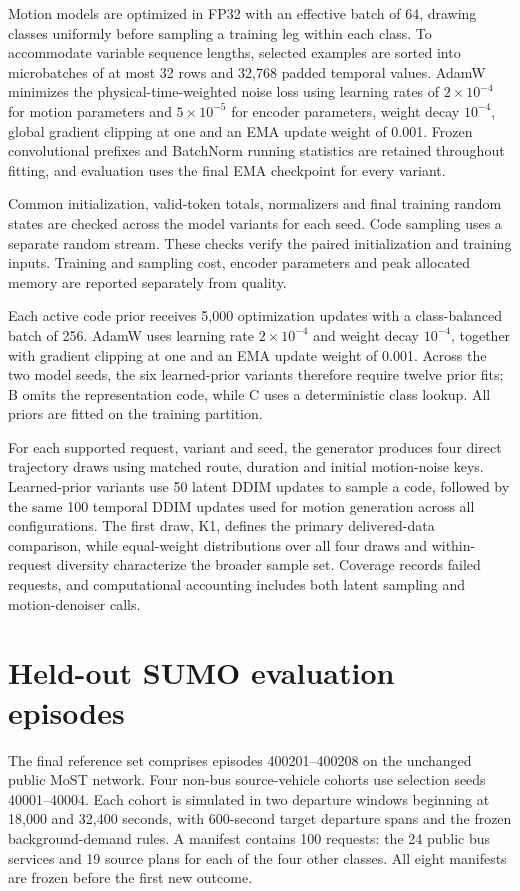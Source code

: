 Motion models are optimized in FP32 with an effective batch of 64, drawing classes uniformly before sampling a training leg within each class. To accommodate variable sequence lengths, selected examples are sorted into microbatches of at most 32 rows and 32,768 padded temporal values. AdamW minimizes the physical-time-weighted noise loss using learning rates of $2\times10^{-4}$ for motion parameters and $5\times10^{-5}$ for encoder parameters, weight decay $10^{-4}$, global gradient clipping at one and an EMA update weight of 0.001. Frozen convolutional prefixes and BatchNorm running statistics are retained throughout fitting, and evaluation uses the final EMA checkpoint for every variant.

Common initialization, valid-token totals, normalizers and final training random states are checked across the model variants for each seed. Code sampling uses a separate random stream. These checks verify the paired initialization and training inputs. Training and sampling cost, encoder parameters and peak allocated memory are reported separately from quality.

Each active code prior receives 5,000 optimization updates with a class-balanced batch of 256. AdamW uses learning rate $2\times10^{-4}$ and weight decay $10^{-4}$, together with gradient clipping at one and an EMA update weight of 0.001. Across the two model seeds, the six learned-prior variants therefore require twelve prior fits; B omits the representation code, while C uses a deterministic class lookup. All priors are fitted on the training partition.

For each supported request, variant and seed, the generator produces four direct trajectory draws using matched route, duration and initial motion-noise keys. Learned-prior variants use 50 latent DDIM updates to sample a code, followed by the same 100 temporal DDIM updates used for motion generation across all configurations. The first draw, K1, defines the primary delivered-data comparison, while equal-weight distributions over all four draws and within-request diversity characterize the broader sample set. Coverage records failed requests, and computational accounting includes both latent sampling and motion-denoiser calls.

\section{Held-out SUMO evaluation episodes}
The final reference set comprises episodes 400201--400208 on the unchanged public MoST network. Four non-bus source-vehicle cohorts use selection seeds 40001--40004. Each cohort is simulated in two departure windows beginning at 18,000 and 32,400 seconds, with 600-second target departure spans and the frozen background-demand rules. A manifest contains 100 requests: the 24 public bus services and 19 source plans for each of the four other classes. All eight manifests are frozen before the first new outcome.

